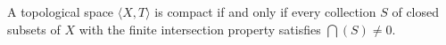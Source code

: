 A topological space $\langle X, T \rangle$ is compact if and only if every collection $S$ of closed subsets of $X$ with the finite intersection property satisfies $\bigcap(S) \neq 0$.

